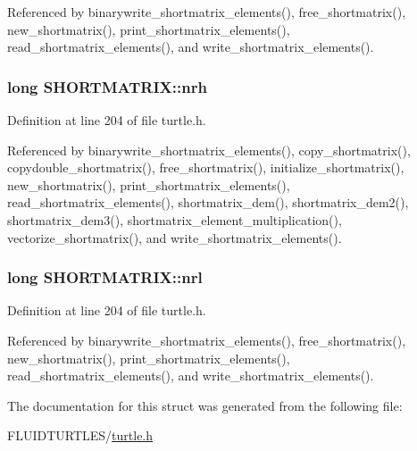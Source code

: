 Referenced by binarywrite\-\_\-shortmatrix\-\_\-elements(), free\-\_\-shortmatrix(), new\-\_\-shortmatrix(), print\-\_\-shortmatrix\-\_\-elements(), read\-\_\-shortmatrix\-\_\-elements(), and write\-\_\-shortmatrix\-\_\-elements().

\hypertarget{struct_s_h_o_r_t_m_a_t_r_i_x_ad9f8f6fb48d28831fe8f014d6d65113c}{
\subsubsection[{nrh}]{\setlength{\rightskip}{0pt plus 5cm}long S\-H\-O\-R\-T\-M\-A\-T\-R\-I\-X\-::nrh}}\label{struct_s_h_o_r_t_m_a_t_r_i_x_ad9f8f6fb48d28831fe8f014d6d65113c}


Definition at line 204 of file turtle.\-h.



Referenced by binarywrite\-\_\-shortmatrix\-\_\-elements(), copy\-\_\-shortmatrix(), copydouble\-\_\-shortmatrix(), free\-\_\-shortmatrix(), initialize\-\_\-shortmatrix(), new\-\_\-shortmatrix(), print\-\_\-shortmatrix\-\_\-elements(), read\-\_\-shortmatrix\-\_\-elements(), shortmatrix\-\_\-dem(), shortmatrix\-\_\-dem2(), shortmatrix\-\_\-dem3(), shortmatrix\-\_\-element\-\_\-multiplication(), vectorize\-\_\-shortmatrix(), and write\-\_\-shortmatrix\-\_\-elements().

\hypertarget{struct_s_h_o_r_t_m_a_t_r_i_x_aa7432b4b900beac6e59f54734339f272}{
\subsubsection[{nrl}]{\setlength{\rightskip}{0pt plus 5cm}long S\-H\-O\-R\-T\-M\-A\-T\-R\-I\-X\-::nrl}}\label{struct_s_h_o_r_t_m_a_t_r_i_x_aa7432b4b900beac6e59f54734339f272}


Definition at line 204 of file turtle.\-h.



Referenced by binarywrite\-\_\-shortmatrix\-\_\-elements(), free\-\_\-shortmatrix(), new\-\_\-shortmatrix(), print\-\_\-shortmatrix\-\_\-elements(), read\-\_\-shortmatrix\-\_\-elements(), and write\-\_\-shortmatrix\-\_\-elements().



The documentation for this struct was generated from the following file\-:\begin{DoxyCompactItemize}
\item 
F\-L\-U\-I\-D\-T\-U\-R\-T\-L\-E\-S/\hyperlink{turtle_8h}{turtle.\-h}\end{DoxyCompactItemize}
